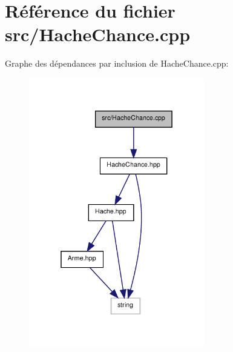 \section{Référence du fichier src/\-Hache\-Chance.cpp}
\label{_hache_chance_8cpp}
Graphe des dépendances par inclusion de Hache\-Chance.\-cpp\-:\nopagebreak
\begin{figure}[H]
\begin{center}
\leavevmode
\includegraphics[width=217pt]{_hache_chance_8cpp__incl}
\end{center}
\end{figure}
